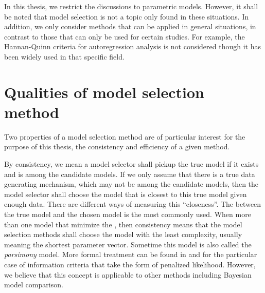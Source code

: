 In this thesis, we restrict the discussions to parametric models. However, it
shall be noted that model selection is not a topic only found in these
situations. In addition, we only consider methods that can be applied in
general situations, in contrast to those that can only be used for certain
studies. For example, the Hannan-Quinn \cite{Hanna:1979us} criteria for
autoregression analysis is not considered though it has been widely used in
that specific field.

\section{Qualities of model selection method}
\label{sec of model selection method}


Two properties of a model selection method are of particular interest for the
purpose of this thesis, the consistency and efficiency of a given method.

By consistency, we mean a model selector shall pickup the true model if it
exists and is among the candidate models. If we only assume that there is a
true data generating mechanism, which may not be among the candidate models,
then the model selector shall choose the model that is closest to this true
model given enough data. There are different ways of measuring this
``closeness''. The \kl between the true model and the chosen model is the most
commonly used. When more than one model that minimize the \kl, then
consistency means that the model selection methods shall choose the model with
the least complexity, usually meaning the shortest parameter vector. Sometime
this model is also called the \emph{parsimony} model. More formal treatment
can be found in \cite{Sin:1996vs} and \cite[][sec.~4.1
and~4.3]{Claeskens:2008tq} for the particular case of information criteria
that take the form of penalized likelihood. However, we believe that this
concept is applicable to other methods including Bayesian model comparison.

